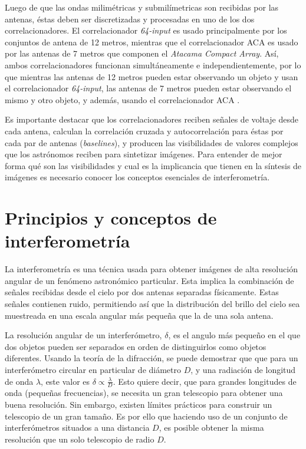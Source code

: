 Luego de que las ondas milimétricas y submilímetricas son recibidas por las antenas, éstas deben ser discretizadas y procesadas en uno de los dos correlacionadores. El correlacionador \textit{64-input} es usado principalmente por los conjuntos de antena de 12 metros, mientras que el correlacionador ACA es usado por las antenas de 7 metros que componen el \textit{Atacama Compact Array}. Así, ambos correlacionadores funcionan simultáneamente e independientemente, por lo que mientras las antenas de 12 metros pueden estar observando un objeto y usan el correlacionador \textit{64-input}, las antenas de 7 metros pueden estar observando el mismo y otro objeto, y además, usando el correlacionador ACA \citep{alma-handbook}.

Es importante destacar que los correlacionadores reciben señales de voltaje desde cada antena, calculan la correlación cruzada y autocorrelación para éstas por cada par de antenas (\textit{baselines}), y producen las visibilidades de valores complejos que los astrónomos reciben para sintetizar imágenes. Para entender de mejor forma qué son las visibilidades y cual es la implicancia que tienen en la síntesis de imágenes es necesario conocer los conceptos esenciales de interferometría.

\section{Principios y conceptos de interferometría}

La interferometría es una técnica usada para obtener imágenes de alta resolución angular de un fenómeno astronómico particular. Esta implica la combinación de señales recibidas desde el cielo por dos antenas separadas físicamente. Estas señales contienen ruido, permitiendo así que la distribución del brillo del cielo sea muestreada en una escala angular más pequeña que la de una sola antena.

La resolución angular de un interferómetro, $\delta$, es el angulo más pequeño en el que dos objetos pueden ser separados en orden de distinguirlos como objetos diferentes. Usando la teoría de la difracción, se puede demostrar que que para un interferómetro circular en particular de diámetro $D$, y una radiación de longitud de onda $\lambda$, este valor es $\delta \propto \frac{\lambda}{D}$. Esto quiere decir, que para grandes longitudes de onda (pequeñas frecuencias), se necesita un gran telescopio para obtener una buena resolución. Sin embargo, existen límites prácticos para construir un telescopio de un gran tamaño. Es por ello que haciendo uso de un conjunto de interferómetros situados a una distancia $D$, es posible obtener la misma resolución que un solo telescopio de radio $D$.



